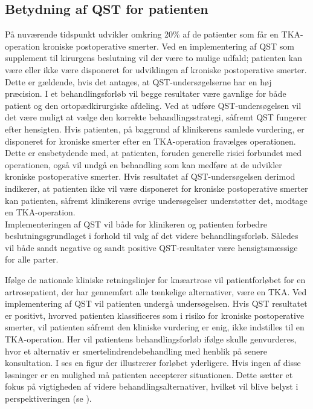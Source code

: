 \subsection{Betydning af QST for patienten}
På nuværende tidspunkt udvikler omkring 20\% af de patienter som får en TKA-operation kroniske postoperative smerter. Ved en implementering af QST som supplement til kirurgens beslutning vil der være to mulige udfald; patienten kan være eller ikke være disponeret for udviklingen af kroniske postoperative smerter. Dette er gældende, hvis det antages, at QST-undersøgelserne har en høj præcision. I et behandlingsforløb vil begge resultater være gavnlige for både patient og den ortopædkirurgiske afdeling. Ved at udføre QST-undersøgelsen vil det være muligt at vælge den korrekte behandlingsstrategi, såfremt QST fungerer efter hensigten. Hvis patienten, på baggrund af klinikerens samlede vurdering, er disponeret for kroniske smerter efter en TKA-operation fravælges operationen. Dette er ensbetydende med, at patienten, foruden generelle risici forbundet med operationen, også vil undgå en behandling som kan medføre at de udvikler kroniske postoperative smerter. Hvis resultatet af QST-undersøgelsen derimod indikerer, at patienten ikke vil være disponeret for kroniske postoperative smerter kan patienten, såfremt klinikerens øvrige undersøgelser understøtter det, modtage en TKA-operation. \\
Implementeringen af QST vil både for klinikeren og patienten forbedre beslutningsgrundlaget i forhold til valg af det videre behandlingsforløb. Således vil både sandt negative og sandt positive QST-resultater være hensigtsmæssige for alle parter.


Ifølge de nationale kliniske retningslinjer for knæartrose vil patientforløbet for en artrosepatient, der har gennemført alle tænkelige alternativer, være en TKA. \citep{brostrom2012} Ved implementering af QST vil patienten undergå undersøgelsen. Hvis QST resultatet er positivt, hvorved patienten klassificeres som i risiko for kroniske postoperative smerter, vil patienten såfremt den kliniske vurdering er enig, ikke indstilles til en TKA-operation. Her vil patientens behandlingsforløb ifølge  skulle genvurderes, hvor et alternativ er smertelindrendebehandling med henblik på senere konsultation. I  ses en figur der illustrerer forløbet yderligere. Hvis ingen af disse løsninger er en mulighed må patienten accepterer situationen. Dette sætter et fokus på vigtigheden af videre behandlingsalternativer, hvilket vil blive belyst i perspektiveringen (se ). 
